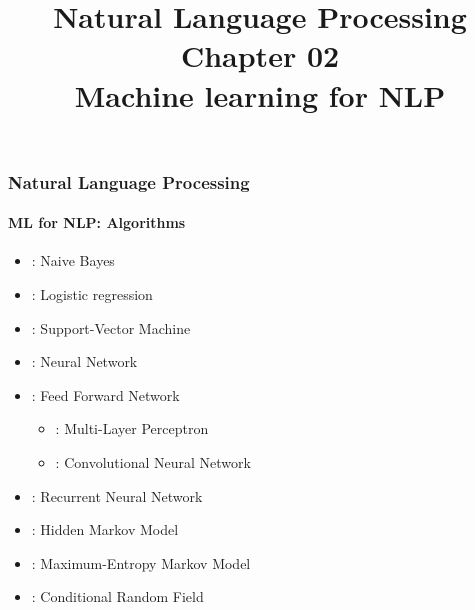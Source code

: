 \documentclass[xcolor=table]{beamer}
\title[ESI - NLP: 02- ML for NLP]%
{Natural Language Processing\\Chapter 02\\Machine learning for NLP}
\begin{document}
	
%		
%		
	
	\begin{frame}
		\frametitle{Natural Language Processing}
		\framesubtitle{ML for NLP: Algorithms}
		
		\begin{itemize}
			\item {}: Naive Bayes
			\item {}: Logistic regression
			\item {}: Support-Vector Machine
			\item {}: Neural Network
			\item {}: Feed Forward Network
			\begin{itemize}
				\item {}: Multi-Layer Perceptron
				\item {}: Convolutional Neural Network
			\end{itemize}
			\item {}: Recurrent Neural Network
			\item {}: Hidden Markov Model
			\item {}: Maximum-Entropy Markov Model
			\item {}: Conditional Random Field
		\end{itemize}
		
	\end{frame}
	
\end{document}

